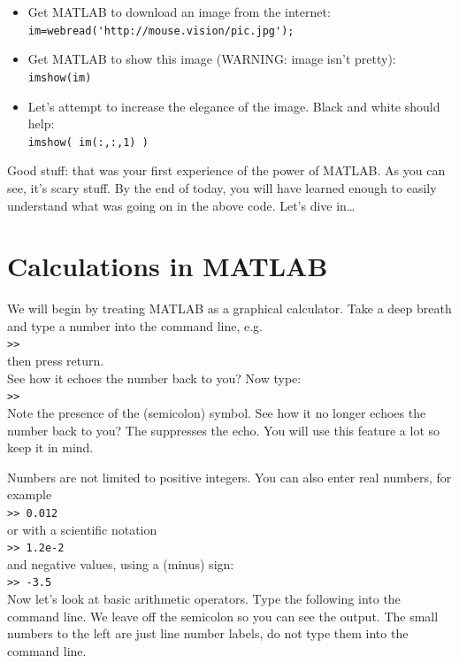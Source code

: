 \documentclass{article}
\begin{document}
\begin{itemize}
\item Get MATLAB to download an image from the internet:\\
\verb|im=webread('http://mouse.vision/pic.jpg');|\\
\item Get MATLAB to show this image (WARNING: image isn't pretty):\\
\verb|imshow(im)|\\
\item Let's attempt to increase the elegance of the image. Black and white should help:\\
\verb|imshow( im(:,:,1) )|\\
\end{itemize}

Good stuff: that was your first experience of the power of MATLAB. 
As you can see, it's scary stuff. 
By the end of today, you will have learned enough to easily understand what was going on in the above code.
Let's dive in\ldots 

\pagebreak
\section{Calculations in MATLAB}

We will begin by treating MATLAB as a graphical calculator.
Take a deep breath and type a number into the command line, e.g. \\

\verb|>>|  \\
then press return. \\
See how it echoes the number back to you? Now type: \\
\verb|>>|  \\
Note the presence of the \mcode{;} (semicolon) symbol.
See how it no longer echoes the number back to you?
The \mcode{;} suppresses the echo.
You will use this feature a lot so keep it in mind.

Numbers are not limited to positive integers.
You can also enter real numbers, for example \\
\verb|>> 0.012| \\
or with a scientific notation \\
\verb|>> 1.2e-2| \\
and negative values, using a \mcode{-} (minus) sign:\\
\verb|>> -3.5| \\

Now let's look at basic arithmetic operators.
Type the following into the command line. 
We leave off the semicolon so you can see the output. 
The small numbers to the left are just line number labels, do not type them into the command line. 
\end{document}
